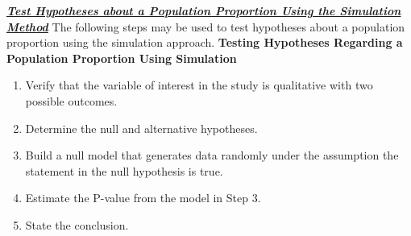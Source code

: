 \documentclass{report}
\begin{document}
    \bigbreak \noindent \bigbreak \noindent 
    \textbf{\textit{\underline{Test Hypotheses about a Population Proportion Using the Simulation Method}}}
    \bigbreak \noindent 
    The following steps may be used to test hypotheses about a population proportion using the simulation approach.
    \bigbreak \noindent 
    \textbf{Testing Hypotheses Regarding a Population Proportion Using Simulation}
    \bigbreak \noindent 
    \begin{enumerate}
        \item Verify that the variable of interest in the study is qualitative with two possible outcomes.
        \item Determine the null and alternative hypotheses. 
        \item Build a null model that generates data randomly under the assumption the statement in the null hypothesis is true.
        \item Estimate the P-value from the model in Step 3.
        \item State the conclusion.
    \end{enumerate}
\end{document}
